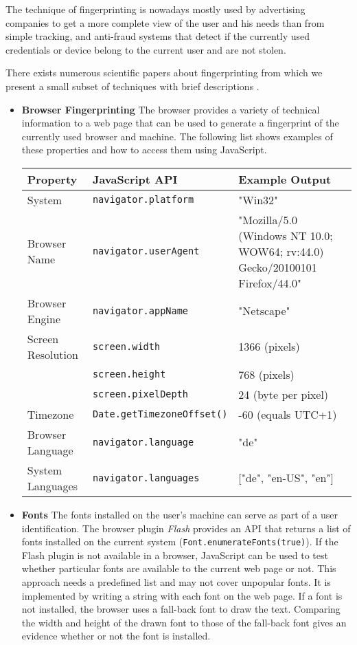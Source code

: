 	The technique of fingerprinting is nowadays mostly used by advertising companies to get a more complete view of the user and his needs than from simple tracking, and anti-fraud systems that detect if the currently used credentials or device belong to the current user and are not stolen.

	There exists numerous scientific papers about fingerprinting from which we present a small subset of techniques with brief descriptions \cite{paulstone_historysniffing, MBYS11, Nikiforakis:2013:CME:2497621.2498133, Eckersley:2010:UYW:1881151.1881152, MS12, olejnik:hal-00747841}. 
	
	\begin{itemize}
		\item \textbf{Browser Fingerprinting} The browser provides a variety of technical information to a web page that can be used to generate a fingerprint of the currently used browser and machine. The following list shows examples of these properties and how to access them using JavaScript. 
		
		\begin{tabular}{|l|l|p{}|} \hline
			\textbf{Property} & \textbf{JavaScript API} & \textbf{Example Output} \\ \hline
			System & \texttt{navigator.platform} & "Win32" \\ \hline
			Browser Name & \texttt{navigator.userAgent} & "Mozilla/5.0 (Windows NT 10.0; WOW64; rv:44.0) Gecko/20100101 Firefox/44.0" \\ \hline
			Browser Engine & \texttt{navigator.appName} & "Netscape" \\ \hline
			Screen Resolution & \texttt{screen.width} & 1366 (pixels) \\
			& \texttt{screen.height} & 768 (pixels) \\
			& \texttt{screen.pixelDepth} & 24 (byte per pixel) \\ \hline
			Timezone & \texttt{Date.getTimezoneOffset()} & -60 (equals UTC+1) \\ \hline
			Browser Language & \texttt{navigator.language} & "de" \\ \hline
			System Languages & \texttt{navigator.languages} & ["de", "en-US", "en"] \\ \hline
		\end{tabular}
		
		\item \textbf{Fonts} The fonts installed on the user's machine can serve as part of a user identification. The browser plugin \textit{Flash} provides an API that returns a list of fonts installed on the current system (\texttt{Font.enumerateFonts(true)})\cite{flashPlayerGetFonts}. If the Flash plugin is not available in a browser, JavaScript can be used to test whether particular fonts are available to the current web page or not. This approach needs a predefined list and may not cover unpopular fonts. It is implemented by writing a string with each font on the web page. If a font is not installed, the browser uses a fall-back font to draw the text. Comparing the width and height of the drawn font to those of the fall-back font gives an evidence whether or not the font is installed.
		

\end{itemize}
